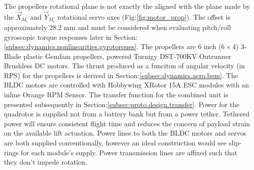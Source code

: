 The propellers rotational plane is not exactly the aligned with the plane made by the $\vec{X}_{M_i}$ and $\vec{Y}_{M_i}$ rotational servo axes (Fig:\ref{fig:motor_prop}). The offset is approximately 28.2 mm and must be considered when evaluating pitch/roll gyroscopic torque responses later in Section:\ref{subsec:dynamics.nonlinearities.gyrotorques}. The propellers are 6 inch ($6 \times 4$) 3-Blade plastic Gemfam propellers, powered Turnigy DST-700KV Outrunner Brushless DC motors. The thrust produced as a funciton of angular velocity (in RPS) for the propellers is derived in Section:\ref{subsec:dynamics.aero.bem}. The BLDC motors are controlled with Hobbywing XRotor 15A ESC modules with an inline Orange RPM Sensor. The transfer function for the combined unit is presented subsequently in Section:\ref{subsec:proto.design.transfer}. Power for the quadrotor is supplied not from a battery bank but from a power tether. Tethered power will ensure consistent flight time and reduces the concern of payload strain on the available lift actuation. Power lines to both the BLDC motors and servos are both supplied conventionally, however an ideal construction would see slip-rings for each module's supply. Power transmission lines are affixed such that they don't impede rotation. 

